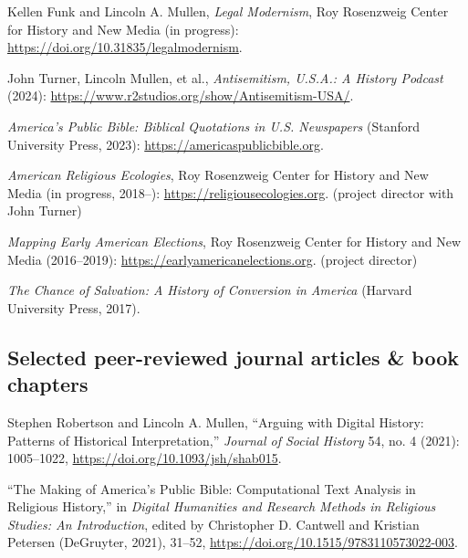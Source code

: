 \documentclass[11pt]{article}
\begin{document}
Kellen Funk and Lincoln A. Mullen, \emph{Legal Modernism}, Roy Rosenzweig Center for History and New Media (in progress): \url{https://doi.org/10.31835/legalmodernism}.

John Turner, Lincoln Mullen, et al., \emph{Antisemitism, U.S.A.: A History Podcast} (2024): \url{https://www.r2studios.org/show/Antisemitism-USA/}.

\emph{America's Public Bible: Biblical Quotations in U.S. Newspapers} (Stanford University Press, 2023): \url{https://americaspublicbible.org}.

\emph{American Religious Ecologies}, Roy Rosenzweig Center for History and New Media (in progress, 2018--): \url{https://religiousecologies.org}. (project director with John Turner)



\emph{Mapping Early American Elections}, Roy Rosenzweig Center for History and New Media (2016--2019): \url{https://earlyamericanelections.org}. (project director)

\emph{The Chance of Salvation: A History of Conversion in America} (Harvard University Press, 2017).

\subsection{Selected peer-reviewed journal articles \& book chapters}\label{peer-reviewed}

Stephen Robertson and Lincoln A. Mullen, ``Arguing with Digital History: Patterns of Historical Interpretation,'' \emph{Journal of Social History} 54, no. 4 (2021): 1005--1022, \url{https://doi.org/10.1093/jsh/shab015}.

``The Making of America's Public Bible: Computational Text Analysis in Religious History,'' in \emph{Digital Humanities and Research Methods in Religious Studies: An Introduction}, edited by Christopher D. Cantwell and Kristian Petersen (DeGruyter, 2021), 31--52, \url{https://doi.org/10.1515/9783110573022-003}.
\end{document}
